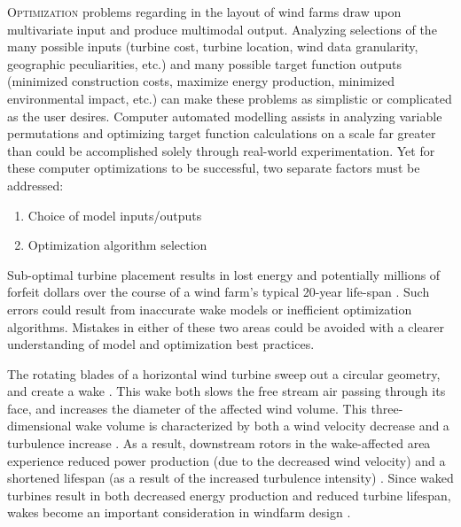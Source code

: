 

\lettrine[nindent=0pt]{O}{ptimization} problems regarding in the layout of wind farms draw upon multivariate input and produce multimodal output.
Analyzing selections of the many possible inputs (turbine cost, turbine location, wind data granularity, geographic peculiarities, etc.) and many possible target function outputs (minimized construction costs, maximize energy production, minimized environmental impact, etc.) can make these problems as simplistic or complicated as the user desires.
Computer automated modelling assists in analyzing variable permutations and optimizing target function calculations on a scale far greater than could be accomplished solely through real-world experimentation.
Yet for these computer optimizations to be successful, two separate factors must be addressed:
\begin{enumerate}
    \item Choice of model inputs/outputs %
    \item Optimization algorithm selection
\end{enumerate}

Sub-optimal turbine placement results in lost energy and potentially millions of forfeit dollars over the course of a wind farm's typical 20-year life-span \cite{HerbertAcero2014}.
Such errors could result from inaccurate wake models or inefficient optimization algorithms.
Mistakes in either of these two areas could be avoided with a clearer understanding of model and optimization best practices.

    The rotating blades of a horizontal wind turbine sweep out a circular geometry, and create a wake \cite{Burton2001}.
    This wake both slows the free stream air passing through its face, and increases the diameter of the affected wind volume.
    This three-dimensional wake volume is characterized by both a wind velocity decrease and a turbulence increase \cite{Larsen2008}.
    As a result, downstream rotors in the wake-affected area experience reduced power production (due to the decreased wind velocity) and a shortened lifespan (as a result of the increased turbulence intensity) \cite{Sanderse2009}. 
    Since waked turbines result in both decreased energy production and reduced turbine lifespan, wakes become an important consideration in windfarm design \cite{HerbertAcero2014}.

